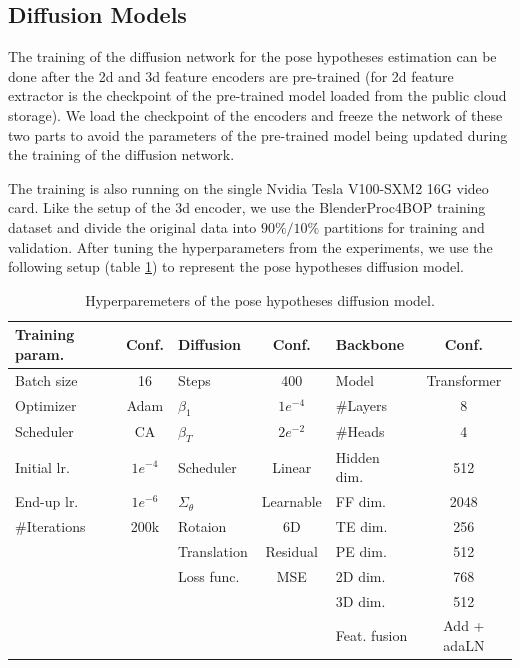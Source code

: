 \documentclass[12pt,DIV14,BCOR12mm,a4paper,footinclude=false,headinclude,parskip=half-,twoside,openright,cleardoublepage=empty,toc=index,bibliography=totoc,listof=totoc]{scrreprt}
\numberwithin{equation}{chapter}
\begin{document}
\subsection{Diffusion Models} 
The training of the diffusion network for the pose hypotheses estimation can be done after the \gls{2d} and \gls{3d} feature encoders are pre-trained (for \gls{2d} feature extractor is the checkpoint of the pre-trained model loaded from the public cloud storage). We load the checkpoint of the encoders and freeze the network of these two parts to avoid the parameters of the pre-trained model being updated during the training of the diffusion network. 

The training is also running on the single Nvidia Tesla V100-SXM2 16G video card. Like the setup of the \gls{3d} encoder, we use the BlenderProc4BOP training dataset and divide the original data into $90\%/10\%$ partitions for training and validation. After tuning the hyperparameters from the experiments, we use the following setup (table \ref{tab:hyper}) to represent the pose hypotheses diffusion model.
\begin{table}[h]
  \centering
  \caption{Hyperparemeters of the pose hypotheses diffusion model.}
  \label{tab:hyper}
  \begin{tabular}{l c | l c | l c}
      \toprule
      Training param. & Conf. & Diffusion & Conf. & Backbone & Conf.\\
      \midrule
      Batch size & 16 & Steps & 400 & Model & Transformer\\
      Optimizer & Adam & $\beta_{1}$ & $1e^{-4}$ & \#Layers & 8\\
      Scheduler & CA & $\beta_{T}$ & $2e^{-2}$ & \#Heads & 4\\
      Initial lr. & $1e^{-4}$ & Scheduler & Linear & Hidden dim. & 512\\
      End-up lr. & $1e^{-6}$ & $\Sigma_{\theta}$ & Learnable & FF dim. & 2048\\
      \#Iterations & 200k & Rotaion & 6D & TE dim. & 256\\
       &  & Translation & Residual & PE dim. & 512\\
       &  & Loss func. & MSE & 2D dim. & 768\\
       &  & & & 3D dim. & 512\\
       &  & & & Feat. fusion & Add + adaLN\\
      \bottomrule
  \end{tabular}
\end{table}
\end{document}
